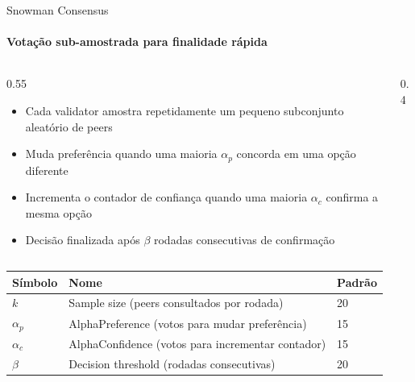 \documentclass[aspectratio=169]{beamer}
\begin{document}
\begin{frame}[shrink=5]{Snowman Consensus}
	\framesubtitle{Votação sub-amostrada para finalidade rápida}

	\begin{columns}[c]
		\begin{column}{0.55\textwidth}
			\begin{itemize}
				\item Cada validator amostra repetidamente um pequeno subconjunto aleatório de peers
				\item Muda preferência quando uma maioria $\alpha_p$ concorda em uma opção diferente
				\item Incrementa o contador de confiança quando uma maioria $\alpha_c$ confirma a mesma opção
				\item Decisão finalizada após $\beta$ rodadas consecutivas de confirmação
			\end{itemize}
		\end{column}
		\begin{column}{0.4\textwidth}
		\end{column}
	\end{columns}

	\vspace{0.3em}
	{\small\begin{tabular}{@{}lll@{}}
		\toprule
		Símbolo & Nome & Padrão \\
		\midrule
		$k$          & Sample size (peers consultados por rodada)          & 20 \\
		$\alpha_p$   & AlphaPreference (votos para mudar preferência)     & 15 \\
		$\alpha_c$   & AlphaConfidence (votos para incrementar contador)  & 15 \\
		$\beta$      & Decision threshold (rodadas consecutivas)          & 20 \\
		\bottomrule
	\end{tabular}}
\end{frame}
\end{document}
